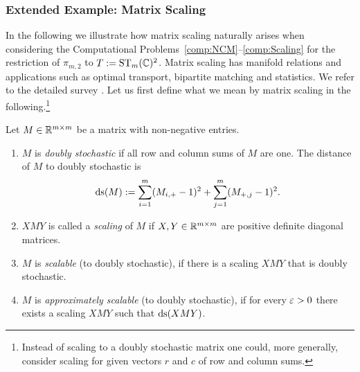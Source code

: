 

\subsubsection*{Extended Example: Matrix Scaling}

In the following we illustrate how matrix scaling naturally arises when considering the Computational Problems~\ref{comp:NCM}--\ref{comp:Scaling} for the restriction of $\pi_{m,2}$ to $T := \operatorname{ST}_m(\mathbb C)^2$. Matrix scaling has manifold relations and applications such as optimal transport, bipartite matching and statistics. We refer to the detailed survey \cite{idel2016review}.
Let us first define what we mean by matrix scaling in the following.\footnote{Instead of scaling to a doubly stochastic matrix one could, more generally, consider scaling for given vectors $r$ and $c$ of row and column sums.}

\begin{defn}\label{defn:MatrixScaling}
	Let $M \in \mathbb R^{m \times m}$ be a matrix with non-negative entries.
	\begin{enumerate}
		\item $M$ is \emph{doubly stochastic} if all row and column sums of $M$ are one. The distance of $M$ to doubly stochastic is
			\begin{equation}\label{eq:DistanceDoublyStochastic}
				\operatorname{ds}(M) := \sum_{i=1}^m (M_{i,+} - 1)^2 + \sum_{j=1}^m (M_{+,j} - 1)^2.
			\end{equation}
		
		\item $XMY$ is called a \emph{scaling} of $M$ if $X,Y \in \mathbb R^{m \times m}$ are positive definite diagonal matrices.
		
		\item $M$ is \emph{scalable} (to doubly stochastic), if there is a scaling $XMY$ that is doubly stochastic.
		
		\item $M$ is \emph{approximately scalable} (to doubly stochastic), if for every $\varepsilon > 0$ there exists a scaling $XMY$ such that $\operatorname{ds}(XMY)$.
		\hfill{}
	\end{enumerate}
\end{defn}

